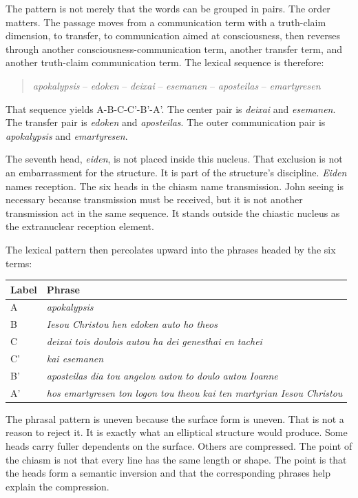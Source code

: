 The pattern is not merely that the words can be grouped in pairs. The order matters. The passage moves from a communication term with a truth-claim dimension, to transfer, to communication aimed at consciousness, then reverses through another consciousness-communication term, another transfer term, and another truth-claim communication term. The lexical sequence is therefore:

\begin{quote}
\textit{apokalypsis} -- \textit{edoken} -- \textit{deixai} -- \textit{esemanen} -- \textit{aposteilas} -- \textit{emartyresen}
\end{quote}

That sequence yields A-B-C-C'-B'-A'. The center pair is \textit{deixai} and \textit{esemanen}. The transfer pair is \textit{edoken} and \textit{aposteilas}. The outer communication pair is \textit{apokalypsis} and \textit{emartyresen}.

The seventh head, \textit{eiden}, is not placed inside this nucleus. That exclusion is not an embarrassment for the structure. It is part of the structure's discipline. \textit{Eiden} names reception. The six heads in the chiasm name transmission. John seeing is necessary because transmission must be received, but it is not another transmission act in the same sequence. It stands outside the chiastic nucleus as the extranuclear reception element.

The lexical pattern then percolates upward into the phrases headed by the six terms:

\begin{center}
\begin{longtable}{@{}p{}p{}@{}}
\toprule
Label & Phrase \\
\midrule
A & \textit{apokalypsis} \\
B & \textit{Iesou Christou hen edoken auto ho theos} \\
C & \textit{deixai tois doulois autou ha dei genesthai en tachei} \\
C' & \textit{kai esemanen} \\
B' & \textit{aposteilas dia tou angelou autou to doulo autou Ioanne} \\
A' & \textit{hos emartyresen ton logon tou theou kai ten martyrian Iesou Christou} \\
\bottomrule
\end{longtable}
\end{center}

The phrasal pattern is uneven because the surface form is uneven. That is not a reason to reject it. It is exactly what an elliptical structure would produce. Some heads carry fuller dependents on the surface. Others are compressed. The point of the chiasm is not that every line has the same length or shape. The point is that the heads form a semantic inversion and that the corresponding phrases help explain the compression.

